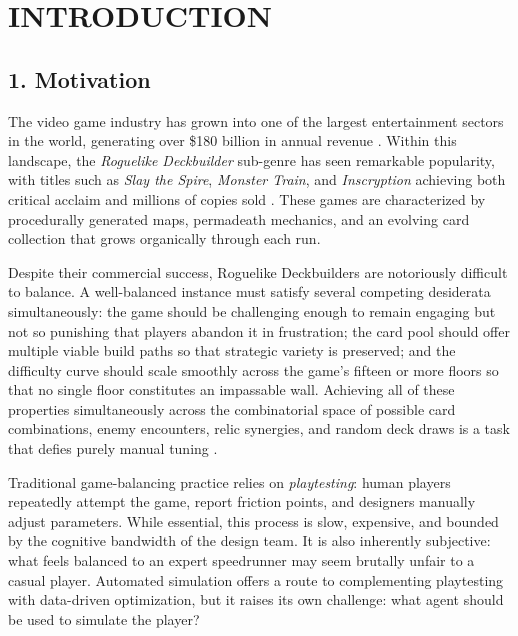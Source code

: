 \clearpage
{}
{}
\chapter*{INTRODUCTION}

\section*{1. Motivation}

The video game industry has grown into one of the largest entertainment sectors in the world, generating over \$180 billion in annual revenue \cite{yannakakis2018artificial}. Within this landscape, the \textit{Roguelike Deckbuilder} sub-genre has seen remarkable popularity, with titles such as \textit{Slay the Spire}, \textit{Monster Train}, and \textit{Inscryption} achieving both critical acclaim and millions of copies sold \cite{slaythespire}. These games are characterized by procedurally generated maps, permadeath mechanics, and an evolving card collection that grows organically through each run.

Despite their commercial success, Roguelike Deckbuilders are notoriously difficult to balance. A well-balanced instance must satisfy several competing desiderata simultaneously: the game should be challenging enough to remain engaging but not so punishing that players abandon it in frustration; the card pool should offer multiple viable build paths so that strategic variety is preserved; and the difficulty curve should scale smoothly across the game's fifteen or more floors so that no single floor constitutes an impassable wall. Achieving all of these properties simultaneously across the combinatorial space of possible card combinations, enemy encounters, relic synergies, and random deck draws is a task that defies purely manual tuning \cite{schell2019art}.

Traditional game-balancing practice relies on \textit{playtesting}: human players repeatedly attempt the game, report friction points, and designers manually adjust parameters. While essential, this process is slow, expensive, and bounded by the cognitive bandwidth of the design team. It is also inherently subjective: what feels balanced to an expert speedrunner may seem brutally unfair to a casual player. Automated simulation offers a route to complementing playtesting with data-driven optimization, but it raises its own challenge: what agent should be used to simulate the player?

